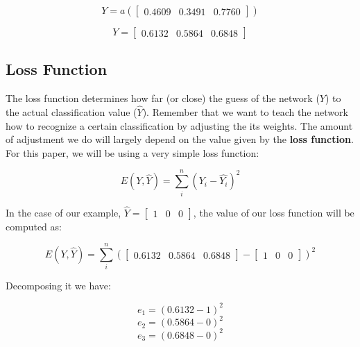\documentclass[a4paper]{article}
\begin{document}
\begin{equation}
  Y=a(\begin{bmatrix}
      0.4609 & 0.3491 & 0.7760
    \end{bmatrix})
\end{equation}

\begin{equation}
  Y=\begin{bmatrix}
      0.6132 & 0.5864 & 0.6848
    \end{bmatrix}
\end{equation}

\subsection{Loss Function}

The loss function determines how far (or close) the guess of the network ($Y$) to the actual classification value ($\widehat{Y}$). Remember that we want to teach the network how to recognize a certain classification by adjusting the its weights. The amount of adjustment we do will largely depend on the value given by the \textbf{loss function}. For this paper, we will be using a very simple loss function:

\begin{equation}
  E(Y, \widehat{Y})=\sum_{i}^{n} {(Y_{i}-\widehat{Y_{i}})^2}
\end{equation}

In the case of our example, $\widehat{Y}=\begin{bmatrix}1 & 0 & 0\end{bmatrix}$, the value of our loss function will be computed as:

\begin{equation}
  E(Y, \widehat{Y})=\sum_{i}^{n}(\begin{bmatrix}0.6132 & 0.5864 & 0.6848\end{bmatrix} - \begin{bmatrix}1 & 0 & 0\end{bmatrix})^2
\end{equation}

Decomposing it we have:

\begin{equation}
  e_{1} = (0.6132 - 1)^2
\end{equation}
\begin{equation}
  e_{2} = (0.5864 - 0)^2
\end{equation}
\begin{equation}
  e_{3} = (0.6848 - 0)^2
\end{equation}
\end{document}
